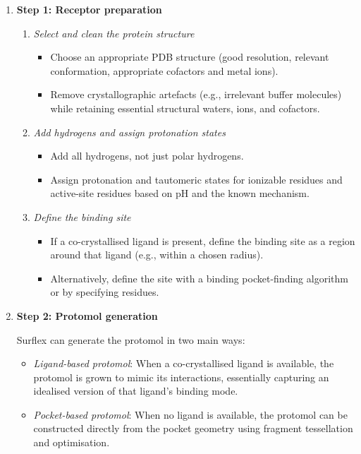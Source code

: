 \documentclass[12pt]{article}
\begin{document}
\begin{enumerate}

\item \textbf{Step 1: Receptor preparation}

\begin{enumerate}
  \item \emph{Select and clean the protein structure}
  \begin{itemize}
    \item Choose an appropriate PDB structure (good resolution, relevant conformation, appropriate cofactors and metal ions).
    \item Remove crystallographic artefacts (e.g., irrelevant buffer molecules) while retaining essential structural waters, ions, and cofactors.
  \end{itemize}
  \item \emph{Add hydrogens and assign protonation states}
  \begin{itemize}
    \item Add all hydrogens, not just polar hydrogens.
    \item Assign protonation and tautomeric states for ionizable residues and active-site residues based on pH and the known mechanism.
  \end{itemize}
  \item \emph{Define the binding site}
  \begin{itemize}
    \item If a co-crystallised ligand is present, define the binding site as a region around that ligand (e.g., within a chosen radius).
    \item Alternatively, define the site with a binding pocket-finding algorithm or by specifying residues.
  \end{itemize}
\end{enumerate}

\item \textbf{Step 2: Protomol generation}

Surflex can generate the protomol in two main ways:
\begin{itemize}
  \item \emph{Ligand-based protomol}: When a co-crystallised ligand is available, the protomol is grown to mimic its interactions, essentially capturing an idealised version of that ligand's binding mode.
  \item \emph{Pocket-based protomol}: When no ligand is available, the protomol can be constructed directly from the pocket geometry using fragment tessellation and optimisation.
\end{itemize}



\end{enumerate}
\end{document}
